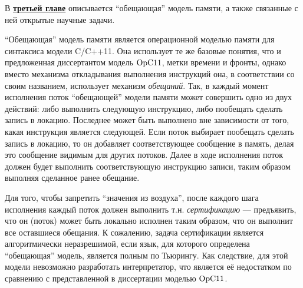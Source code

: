 
В \underline{\textbf{третьей главе}}  описывается ``обещающая'' модель памяти, а также связанные с ней  открытые  научные задачи.

``Обещающая'' модель памяти является операционной моделью памяти для синтаксиса модели C/C++11.
Она использует те же базовые понятия, что и предложенная диссертантом модель $\mathrm{OpC11}$,
метки времени и фронты, однако вместо механизма откладывания выполнения инструкций она,
в соответствии со своим названием, использует механизм \emph{обещаний}. Так, в каждый момент исполнения поток
``обещающей'' модели памяти может совершить одно из двух действий: либо выполнить следующую инструкцию,
либо пообещать сделать запись в локацию. Последнее может быть выполнено вне зависимости от того, какая
инструкция является следующей.
Если поток выбирает пообещать сделать запись в локацию, то он добавляет соответствующее сообщение в память,
делая это сообщение видимым для других потоков. Далее в ходе исполнения поток должен будет выполнить соответствующую инструкцию записи, таким образом выполняя сделанное ранее обещание.

Для того, чтобы запретить ``значения из воздуха'', после каждого шага исполнения каждый поток должен выполнить
т.н. \emph{сертификацию} --- предъявить, что он (поток) может быть локально исполнен таким образом, что
он выполнит все оставшиеся обещания. К сожалению, задача сертификации является алгоритмически неразрешимой, если
язык, для которого определена ``обещающая'' модель, является полным по Тьюрингу. Как следствие, для
этой модели невозможно разработать интерпретатор, что является её недостатком по сравнению с представленной в
диссертации моделью $\mathrm{OpC11}$.

